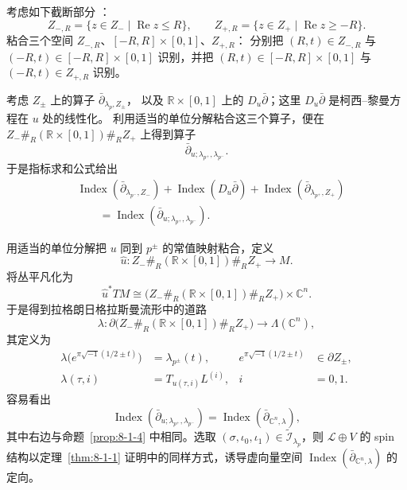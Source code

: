 考虑如下截断部分%
：
\[
 Z_{-,R}=\{z\in Z_-\mid\operatorname{Re}z\leq R\},
 \qquad
 Z_{+,R}=\{z\in Z_+\mid\operatorname{Re}z\geq-R\}.
\]
粘合三个空间 $Z_{-,R}$、$[-R,R]\times[0,1]$、$Z_{+,R}$：
分别把 $(R,t)\in Z_{-,R}$ 与
$(-R,t)\in[-R,R]\times[0,1]$ 识别，并把
$(R,t)\in[-R,R]\times[0,1]$ 与 $(-R,t)\in Z_{+,R}$ 识别。

考虑 $Z_\pm$ 上的算子 $\bar\partial_{\lambda_p,Z_\pm}$，
以及 $\mathbb R\times[0,1]$ 上的 $D_u\bar\partial$；这里
$D_u\bar\partial$ 是柯西--黎曼方程在 $u$ 处的线性化。
利用适当的单位分解粘合这三个算子，便在
$Z_-\#_R(\mathbb R\times[0,1])\#_R Z_+$ 上得到算子
\[
 \bar\partial_{u;\lambda_{p^+},\lambda_{p^-}}.
\]
于是指标求和公式给出%
\begin{equation}
\begin{aligned}
 &\operatorname{Index}(\bar\partial_{\lambda_{p^-},Z_-})
 +\operatorname{Index}(D_u\bar\partial)
 +\operatorname{Index}(\bar\partial_{\lambda_{p^+},Z_+})\\
 &\qquad={}
 \operatorname{Index}
 (\bar\partial_{u;\lambda_{p^+},\lambda_{p^-}}).
\end{aligned}
\tag{8.1.12}\label{eq:8-1-12}
\end{equation}

用适当的单位分解把 $u$ 同到 $p^\pm$ 的常值映射粘合，定义
\[
 \widehat u\colon
 Z_-\#_R(\mathbb R\times[0,1])\#_R Z_+
 \longrightarrow M.
\]
将丛平凡化为
\[
 \widehat u^*TM\cong
 \bigl(Z_-\#_R(\mathbb R\times[0,1])\#_R Z_+\bigr)
 \times\mathbb C^n.
\]
于是得到拉格朗日格拉斯曼流形中的道路
\[
 \lambda\colon
 \partial\bigl(Z_-\#_R(\mathbb R\times[0,1])\#_R Z_+\bigr)
 \longrightarrow\Lambda(\mathbb C^n),
\]
其定义为
\[
\begin{aligned}
 \lambda\bigl(e^{\pi\sqrt{-1}(1/2\pm t)}\bigr)
 &=\lambda_{p^\pm}(t),
 &e^{\pi\sqrt{-1}(1/2\pm t)}&\in\partial Z_\pm,\\
 \lambda(\tau,i)&=T_{u(\tau,i)}L^{(i)},
 &i&=0,1.
\end{aligned}
\]
容易看出
\begin{equation}
 \operatorname{Index}
 (\bar\partial_{u;\lambda_{p^+},\lambda_{p^-}})
 =\operatorname{Index}(\bar\partial_{\mathbb C^n,\lambda}),
 \tag{8.1.13}\label{eq:8-1-13}
\end{equation}
其中右边与命题~\ref{prop:8-1-4} 中相同。选取
$(\sigma,\iota_0,\iota_1)\in
\widetilde{\mathcal I}_{\lambda_p}$，则
$\mathcal L\oplus V$ 的 spin 结构以定理~\ref{thm:8-1-1}
证明中的同样方式，诱导虚向量空间
$\operatorname{Index}(\bar\partial_{\mathbb C^n,\lambda})$ 的定向。

